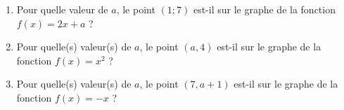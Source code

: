 
\begin{exercice}\label{exoSeconde-0075}

    \begin{enumerate}
        \item
            Pour quelle valeur de \( a\), le point \( (1;7)\) est-il sur le graphe de la fonction \( f(x)=2x+a\) ?
        \item
            Pour quelle(s) valeur(s) de \( a\), le point \( (a,4)\) est-il sur le graphe de la fonction \( f(x)=x^2\) ?
        \item
            Pour quelle(s) valeur(s) de \( a\), le point \( (7,a+1)\) est-il sur le graphe de la fonction \( f(x)=-x\) ?
    \end{enumerate}

\end{exercice}
